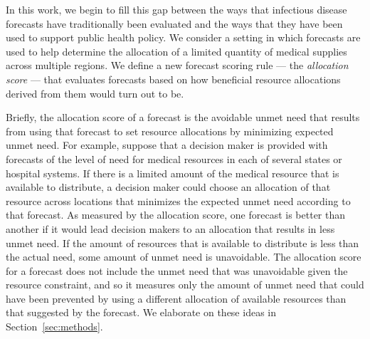 \documentclass{article}\usepackage[]{graphicx}\usepackage[]{xcolor}
\begin{document}
In this work, we begin to fill this gap between the ways that infectious disease forecasts have traditionally been evaluated and the ways that they have been used to support public health policy.
We consider a setting in which forecasts are used to help determine the allocation of a limited quantity of medical supplies across multiple regions.
We define a new forecast scoring rule --- the {\em allocation score} --- that evaluates forecasts based on how beneficial resource allocations derived from them would turn out to be.

Briefly, the allocation score of a forecast is the avoidable unmet need that results from using that forecast to set resource allocations by minimizing expected unmet need.
For example, suppose that a decision maker is provided with forecasts of the level of need for medical resources in each of several states or hospital systems.
If there is a limited amount of the medical resource that is available to distribute, a decision maker could choose an allocation of that resource across locations that minimizes the expected unmet need according to that forecast.
As measured by the allocation score, one forecast is better than another if it would lead decision makers to an allocation that results in less unmet need.
If the amount of resources that is available to distribute is less than the actual need, some amount of unmet need is unavoidable.
The allocation score for a forecast does not include the unmet need that was unavoidable given the resource constraint, and so it measures only the amount of unmet need that could have been prevented by using a different allocation of available resources than that suggested by the forecast.
We elaborate on these ideas in Section~\ref{sec:methods}.
\end{document}
